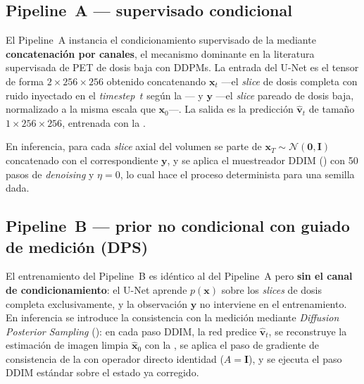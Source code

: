 \subsection{Pipeline~A — supervisado condicional}
\label{sec:pet-pipeline-a}

El Pipeline~A instancia el condicionamiento supervisado de la
 mediante \textbf{concatenación
por canales}, el mecanismo dominante en la literatura supervisada
de PET de dosis baja con DDPMs. La entrada del U-Net es el tensor
de forma $2 \times 256 \times 256$ obtenido concatenando
$\mathbf{x}_t$ —el \textit{slice} de dosis completa con ruido
inyectado en el \textit{timestep}~$t$ según la
— y $\mathbf{y}$ —el \textit{slice}
pareado de dosis baja, normalizado a la misma escala que
$\mathbf{x}_0$—. La salida es la predicción $\hat{\mathbf{v}}_t$ de
tamaño $1 \times 256 \times 256$, entrenada con la
.

En inferencia, para cada \textit{slice} axial del volumen se parte
de $\mathbf{x}_T \sim \mathcal{N}(\mathbf{0}, \mathbf{I})$
concatenado con el correspondiente $\mathbf{y}$, y se aplica el
muestreador DDIM () con 50 pasos de
\textit{denoising} y $\eta = 0$, lo cual hace el proceso
determinista para una semilla dada.

\subsection{Pipeline~B — prior no condicional con guiado de medición
(DPS)}
\label{sec:pet-pipeline-b}

El entrenamiento del Pipeline~B es idéntico al del Pipeline~A
pero \textbf{sin el canal de condicionamiento}: el U-Net aprende
$p(\mathbf{x})$ sobre los \textit{slices} de dosis completa
exclusivamente, y la observación $\mathbf{y}$ no interviene en el
entrenamiento. En inferencia se introduce la consistencia con la
medición mediante \textit{Diffusion Posterior Sampling}
(): en cada paso DDIM, la red
predice $\hat{\mathbf{v}}_t$, se reconstruye la estimación de
imagen limpia $\hat{\mathbf{x}}_0$ con la , se
aplica el paso de gradiente de consistencia de la
 con operador directo identidad ($A =
\mathbf{I}$), y se ejecuta el paso DDIM estándar sobre el estado ya
corregido.


